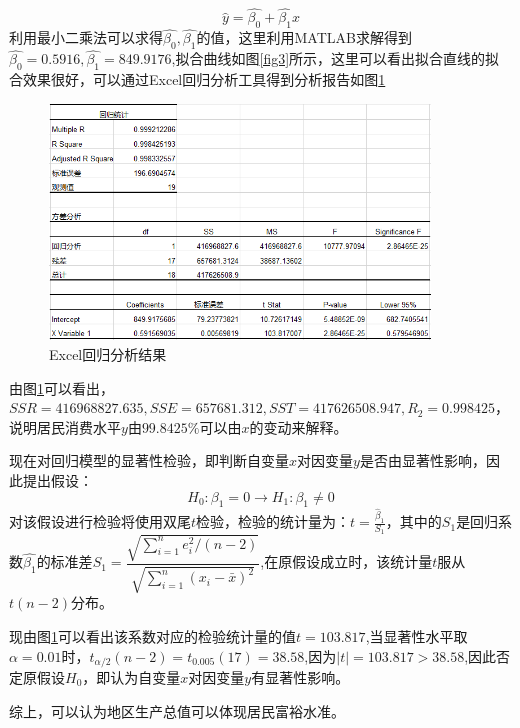\documentclass[UTF8,oneside,cs4side]{ctexart}
\begin{document}
    \begin{equation}
    \hat{y}=\hat{\beta_{0}}+\hat{\beta_{1}}x
    \end{equation}
    利用最小二乘法可以求得$\hat{\beta_{0}},\hat{\beta_{1}}$的值，这里利用MATLAB求解得到$\hat{\beta_{0}}=0.5916,\hat{\beta_{1}}=849.9176$,拟合曲线如图\ref{fig3}所示，这里可以看出拟合直线的拟合效果很好，可以通过Excel回归分析工具得到分析报告如图\ref{fig4}\par
    \begin{figure}[htb]
    	\centering
    	\includegraphics[width=0.9\textwidth]{fig4.png}
    	\caption{Excel回归分析结果}
    	\label{fig4}
    \end{figure}
    由图\ref{fig4}可以看出，$SSR=416968827.635,SSE=657681.312,SST=417626508.947,R_{2}=0.998425$，说明居民消费水平$y$由$99.8425\% $可以由$x$的变动来解释。\par
    现在对回归模型的显著性检验，即判断自变量$x$对因变量$y$是否由显著性影响，因此提出假设：
    \begin{equation}
    H_{0}:\beta_{1}=0 \longrightarrow H_{1}:\beta_{1}\not= 0
    \end{equation}
    对该假设进行检验将使用双尾$t$检验，检验的统计量为：$t=\frac{\hat{\beta}_{1}}{S_{1}}$，其中的$S_{1}$是回归系数$\hat{\beta_{1}}$的标准差$S_{1}=\dfrac{\sqrt{\sum_{i=1}^{n}e_{i}^{2}/(n-2)}}{\sqrt{\sum_{i=1}^{n}(x_{i}-\bar{x})^{2}}}$,在原假设成立时，该统计量$t$服从$t(n-2)$分布。\par
    现由图\ref{fig4}可以看出该系数对应的检验统计量的值$t=103.817$,当显著性水平取$\alpha=0.01$时，$t_{\alpha/2}(n-2)=t_{0.005}(17)=38.58$,因为$|t|=103.817>38.58$,因此否定原假设$H_{0}$，即认为自变量$x$对因变量$y$有显著性影响。\par
    综上，可以认为地区生产总值可以体现居民富裕水准。
\end{document}
